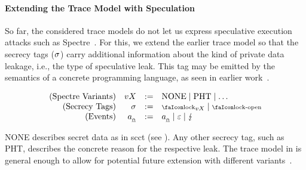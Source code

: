 \documentclass[a4paper,12pt]{article}
\begin{document}
\paragraph{Extending the Trace Model with Speculation}

So far, the considered trace models do not let us express speculative execution attacks such as Spectre~\cite{kocher2019spectre}. 
For this, we extend the earlier trace model so that the secrecy tags ($\sigma_{}{}$) carry additional information about the kind of private data leakage, i.e., the type of speculative leak.
This tag may be emitted by the semantics of a concrete programming language, as seen in earlier work~\cite{fabian2022automatic}. 

\begin{definition}{}
{
\[
  \begin{array}{rrcl}
    (\text{Spectre Variants}) & vX &:=& \operatorname{NONE} \mid \operatorname{PHT} \mid \dots \\
    (\text{Secrecy Tags}) & \varSecuritytag{} &:=& \lock_{vX} \mid \unlock\\ 
    (\text{Events}) & \specEvent &:=& \specEvent \mid \emptyevent \mid \lightning \\ 
  \end{array}
\]
}
\end{definition}

NONE describes secret data as in \gls*{scct} (see ).
Any other secrecy tag, such as PHT, describes the concrete reason for the respective leak.
The trace model in  is general enough to allow for potential future extension with different variants~\cite{kocher2019spectre,maisuradze2018ret2spec,horn2019zero}.
\end{document}
